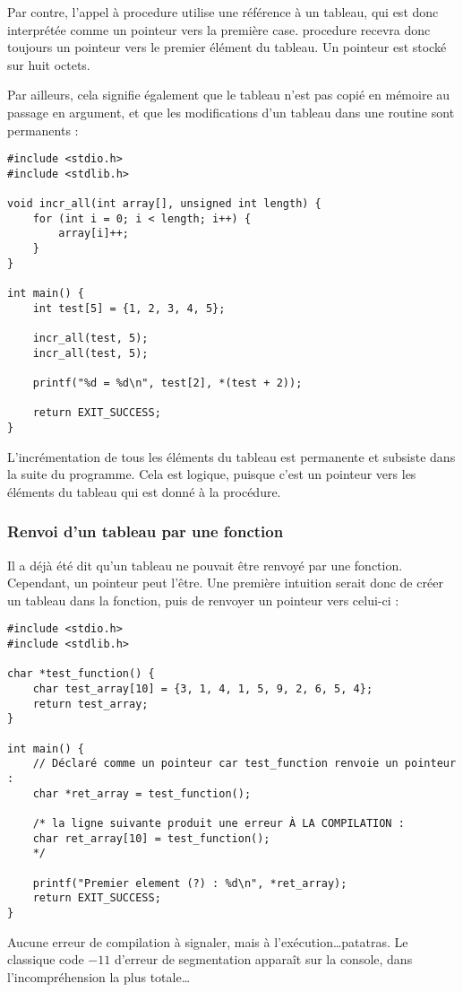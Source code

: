 \documentclass[../../../main.tex]{subfiles}
\begin{document}
Par contre, l'appel à \textsf{procedure} utilise une référence à un tableau, qui est donc interprétée comme un pointeur vers la première case. \textsf{procedure} recevra donc toujours un pointeur vers le premier élément du tableau. Un pointeur est stocké sur huit octets.
 
Par ailleurs, cela signifie également que le tableau n'est pas copié en mémoire au passage en argument, et que les modifications d'un tableau dans une routine sont permanents :
\begin{verbatim}
#include <stdio.h>
#include <stdlib.h>

void incr_all(int array[], unsigned int length) {
	for (int i = 0; i < length; i++) {
		array[i]++;
	}
}

int main() {
	int test[5] = {1, 2, 3, 4, 5};
	
	incr_all(test, 5);
	incr_all(test, 5);

	printf("%d = %d\n", test[2], *(test + 2)); 

	return EXIT_SUCCESS;
}
\end{verbatim}
L'incrémentation de tous les éléments du tableau est permanente et subsiste dans la suite du programme. Cela est logique, puisque c'est un pointeur vers les éléments du tableau qui est donné à la procédure.
\subsubsection{Renvoi d'un tableau par une fonction}
Il a déjà été dit qu'un tableau ne pouvait être renvoyé par une fonction. Cependant, un pointeur peut l'être. Une première intuition serait donc de créer un tableau dans la fonction, puis de renvoyer un pointeur vers celui-ci :
\begin{verbatim}
#include <stdio.h>
#include <stdlib.h>

char *test_function() {
	char test_array[10] = {3, 1, 4, 1, 5, 9, 2, 6, 5, 4};
	return test_array;
}

int main() {
	// Déclaré comme un pointeur car test_function renvoie un pointeur :
	char *ret_array = test_function();
	
	/* la ligne suivante produit une erreur À LA COMPILATION :
	char ret_array[10] = test_function();
	*/
	
	printf("Premier element (?) : %d\n", *ret_array);
	return EXIT_SUCCESS;
}
\end{verbatim}
Aucune erreur de compilation à signaler, mais à l'exécution\dots patatras. Le classique code $-11$ d'erreur de segmentation apparaît sur la console, dans l'incompréhension la plus totale\dots
 
\end{document}
